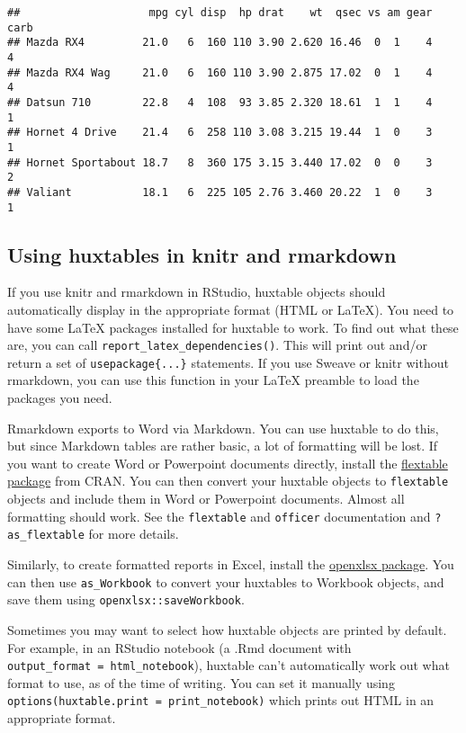 \documentclass[]{article}
\begin{document}
\begin{verbatim}
##                    mpg cyl disp  hp drat    wt  qsec vs am gear carb
## Mazda RX4         21.0   6  160 110 3.90 2.620 16.46  0  1    4    4
## Mazda RX4 Wag     21.0   6  160 110 3.90 2.875 17.02  0  1    4    4
## Datsun 710        22.8   4  108  93 3.85 2.320 18.61  1  1    4    1
## Hornet 4 Drive    21.4   6  258 110 3.08 3.215 19.44  1  0    3    1
## Hornet Sportabout 18.7   8  360 175 3.15 3.440 17.02  0  0    3    2
## Valiant           18.1   6  225 105 2.76 3.460 20.22  1  0    3    1
\end{verbatim}

\FloatBarrier

\hypertarget{using-huxtables-in-knitr-and-rmarkdown}{%
\subsection{Using huxtables in knitr and
rmarkdown}\label{using-huxtables-in-knitr-and-rmarkdown}}

If you use knitr and rmarkdown in RStudio, huxtable objects should
automatically display in the appropriate format (HTML or LaTeX). You
need to have some LaTeX packages installed for huxtable to work. To find
out what these are, you can call \texttt{report\_latex\_dependencies()}.
This will print out and/or return a set of \texttt{usepackage\{...\}}
statements. If you use Sweave or knitr without rmarkdown, you can use
this function in your LaTeX preamble to load the packages you need.

Rmarkdown exports to Word via Markdown. You can use huxtable to do this,
but since Markdown tables are rather basic, a lot of formatting will be
lost. If you want to create Word or Powerpoint documents directly,
install the
\href{https://cran.r-project.org/package=flextable}{flextable package}
from CRAN. You can then convert your huxtable objects to
\texttt{flextable} objects and include them in Word or Powerpoint
documents. Almost all formatting should work. See the \texttt{flextable}
and \texttt{officer} documentation and \texttt{?as\_flextable} for more
details.

Similarly, to create formatted reports in Excel, install the
\href{https://cran.r-project.org/package=openxlsx}{openxlsx package}.
You can then use \texttt{as\_Workbook} to convert your huxtables to
Workbook objects, and save them using \texttt{openxlsx::saveWorkbook}.

Sometimes you may want to select how huxtable objects are printed by
default. For example, in an RStudio notebook (a .Rmd document with
\texttt{output\_format\ =\ html\_notebook}), huxtable can't
automatically work out what format to use, as of the time of writing.
You can set it manually using
\texttt{options(huxtable.print\ =\ print\_notebook)} which prints out
HTML in an appropriate format.
\end{document}
